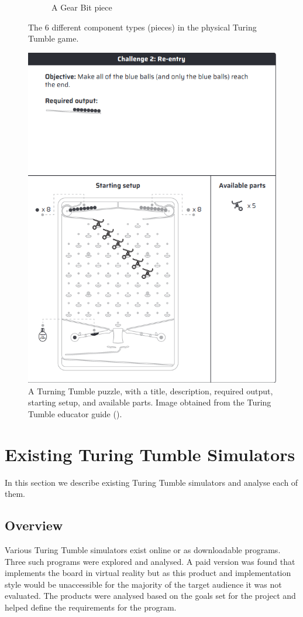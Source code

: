 \documentclass{l4proj}
\begin{document}
\begin{figure}
\begin{subfigure}[b]{0.20\textwidth}
        \caption{A Gear Bit piece \\}
        \label{fig:phyGearbit}
    \end{subfigure}
    \caption{The 6 different component types (pieces) in the physical Turing Tumble game.}
    \label{fig:physicalPieces}
\end{figure}

\begin{figure}
    \centering
    \includegraphics[width=0.5\linewidth]{images/puzzleExample.png}
    \caption{A Turning Tumble puzzle, with a title, description, required output, starting setup, and available parts. Image obtained from the Turing Tumble educator guide (\cite{educator_resources}).}
    \label{fig:puzzleExample}
\end{figure}


\section{Existing Turing Tumble Simulators}
In this section we describe existing Turing Tumble simulators and analyse each of them.

\subsection{Overview}
Various Turing Tumble simulators exist online or as downloadable programs. Three such programs were explored and analysed. A paid version was found that implements the board in virtual reality but as this product and implementation style would be unaccessible for the majority of the target audience it was not evaluated. The products were analysed based on the goals set for the project and helped define the requirements for the program.
\end{document}

